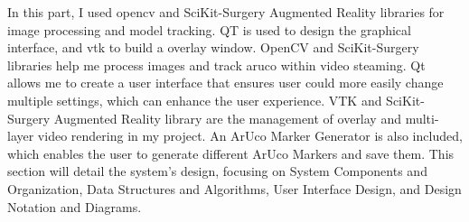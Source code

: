 \documentclass[12pt]{article}
\begin{document}
In this part, I used \gls{opencv}\cite{opencv_library} and SciKit-Surgery Augmented Reality\cite{Thompson_SciKit-Surgery_Compact_Libraries_2020} libraries for image
processing and  model tracking. \gls{QT}\cite{QtWebsite} is used to design the graphical interface, and \gls{vtk}\cite{vtkBook} to build a overlay window\cite{6864541}. OpenCV and SciKit-Surgery libraries help me process images
and track \gls{aruco}\cite{1467495} within video steaming. Qt allows me to create a user interface that ensures  user could more easily change multiple settings, which can enhance the user experience.
VTK and SciKit-Surgery Augmented Reality library are the management of overlay and multi-layer video rendering in my project.
An ArUco Marker Generator is also included, which enables the user to generate different ArUco Markers and save them.
This section will detail the system's design, focusing on System Components and Organization, Data Structures and Algorithms,
User Interface Design, and Design Notation and Diagrams.
\end{document}
